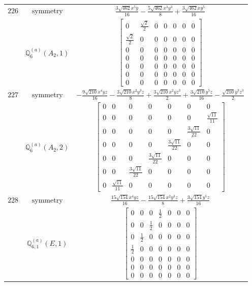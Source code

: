 \documentclass[fleqn,8pt,landscape]{jsarticle}
\begin{document}
\begin{longtable}{ccc}
$ 226 $ & $ \text{symmetry} $ & $ \frac{3 \sqrt{462} x^{5} y}{16} - \frac{5 \sqrt{462} x^{3} y^{3}}{8} + \frac{3 \sqrt{462} x y^{5}}{16} $ \\
$  $ & $ \mathbb{Q}_{6}^{(a)}(A_{2},1) $ & $ \begin{bmatrix} 0 & \frac{\sqrt{2}}{2} & 0 & 0 & 0 & 0 & 0 \\ \frac{\sqrt{2}}{2} & 0 & 0 & 0 & 0 & 0 & 0 \\ 0 & 0 & 0 & 0 & 0 & 0 & 0 \\ 0 & 0 & 0 & 0 & 0 & 0 & 0 \\ 0 & 0 & 0 & 0 & 0 & 0 & 0 \\ 0 & 0 & 0 & 0 & 0 & 0 & 0 \\ 0 & 0 & 0 & 0 & 0 & 0 & 0 \end{bmatrix} $ \\ \hline
$ 227 $ & $ \text{symmetry} $ & $ - \frac{9 \sqrt{210} x^{4} y z}{16} - \frac{3 \sqrt{210} x^{2} y^{3} z}{8} + \frac{3 \sqrt{210} x^{2} y z^{3}}{2} + \frac{3 \sqrt{210} y^{5} z}{16} - \frac{\sqrt{210} y^{3} z^{3}}{2} $ \\
$  $ & $ \mathbb{Q}_{6}^{(a)}(A_{2},2) $ & $ \begin{bmatrix} 0 & 0 & 0 & 0 & 0 & 0 & 0 \\ 0 & 0 & 0 & 0 & 0 & 0 & \frac{\sqrt{11}}{11} \\ 0 & 0 & 0 & 0 & 0 & \frac{3 \sqrt{11}}{22} & 0 \\ 0 & 0 & 0 & 0 & \frac{3 \sqrt{11}}{22} & 0 & 0 \\ 0 & 0 & 0 & \frac{3 \sqrt{11}}{22} & 0 & 0 & 0 \\ 0 & 0 & \frac{3 \sqrt{11}}{22} & 0 & 0 & 0 & 0 \\ 0 & \frac{\sqrt{11}}{11} & 0 & 0 & 0 & 0 & 0 \end{bmatrix} $ \\ \hline
$ 228 $ & $ \text{symmetry} $ & $ \frac{15 \sqrt{154} x^{4} y z}{16} - \frac{15 \sqrt{154} x^{2} y^{3} z}{8} + \frac{3 \sqrt{154} y^{5} z}{16} $ \\
$  $ & $ \mathbb{Q}_{6,1}^{(a)}(E,1) $ & $ \begin{bmatrix} 0 & 0 & 0 & \frac{1}{2} & 0 & 0 & 0 \\ 0 & 0 & \frac{1}{2} & 0 & 0 & 0 & 0 \\ 0 & \frac{1}{2} & 0 & 0 & 0 & 0 & 0 \\ \frac{1}{2} & 0 & 0 & 0 & 0 & 0 & 0 \\ 0 & 0 & 0 & 0 & 0 & 0 & 0 \\ 0 & 0 & 0 & 0 & 0 & 0 & 0 \\ 0 & 0 & 0 & 0 & 0 & 0 & 0 \end{bmatrix} $ \\ \hline

\end{longtable}
\end{document}
